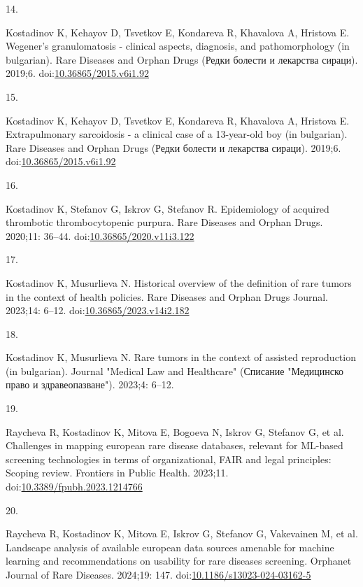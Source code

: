 \documentclass[
  12pt,
  letterpaper,
  DIV=11,
  numbers=noendperiod]{scrartcl}
\newlength{\cslhangindent}
\newlength{\csllabelwidth}
\newenvironment{CSLReferences}[2] %
 {\begin{list}{}{%
  \setlength{\itemindent}{0pt}
  \setlength{\leftmargin}{0pt}
  \setlength{\parsep}{0pt}
  \ifodd #1
   \setlength{\leftmargin}{\cslhangindent}
   \setlength{\itemindent}{-1\cslhangindent}
  \fi
  \setlength{\itemsep}{#2\baselineskip}}}
 {\end{list}}
\newcommand{\CSLLeftMargin}[1]{\parbox[t]{\csllabelwidth}{\strut#1\strut}}
\newcommand{\CSLRightInline}[1]{\parbox[t]{\linewidth - \csllabelwidth}{\strut#1\strut}}
\begin{document}
\begin{CSLReferences}{0}{1}
\CSLLeftMargin{14. }%
\CSLRightInline{Kostadinov K, Kehayov D, Tsvetkov E, Kondareva R,
Khavalova A, Hristova E. Wegener's granulomatosis - clinical aspects,
diagnosis, and pathomorphology (in bulgarian). Rare Diseases and Orphan
Drugs (Редки болести и лекарства сираци). 2019;6.
doi:\href{https://doi.org/10.36865/2015.v6i1.92}{10.36865/2015.v6i1.92}}

\CSLLeftMargin{15. }%
\CSLRightInline{Kostadinov K, Kehayov D, Tsvetkov E, Kondareva R,
Khavalova A, Hristova E. Extrapulmonary sarcoidosis - a clinical case of
a 13-year-old boy (in bulgarian). Rare Diseases and Orphan Drugs (Редки
болести и лекарства сираци). 2019;6.
doi:\href{https://doi.org/10.36865/2015.v6i1.92}{10.36865/2015.v6i1.92}}

\CSLLeftMargin{16. }%
\CSLRightInline{Kostadinov K, Stefanov G, Iskrov G, Stefanov R.
Epidemiology of acquired thrombotic thrombocytopenic purpura. Rare
Diseases and Orphan Drugs. 2020;11: 36--44.
doi:\href{https://doi.org/10.36865/2020.v11i3.122}{10.36865/2020.v11i3.122}}

\CSLLeftMargin{17. }%
\CSLRightInline{Kostadinov K, Musurlieva N. Historical overview of the
definition of rare tumors in the context of health policies. Rare
Diseases and Orphan Drugs Journal. 2023;14: 6--12.
doi:\href{https://doi.org/10.36865/2023.v14i2.182}{10.36865/2023.v14i2.182}}

\CSLLeftMargin{18. }%
\CSLRightInline{Kostadinov K, Musurlieva N. Rare tumors in the context
of assisted reproduction (in bulgarian). Journal "Medical Law and
Healthcare" (Списание "Медицинско право и здравеопазване"). 2023;4:
6--12. }

\CSLLeftMargin{19. }%
\CSLRightInline{Raycheva R, Kostadinov K, Mitova E, Bogoeva N, Iskrov G,
Stefanov G, et al. Challenges in mapping european rare disease
databases, relevant for ML-based screening technologies in terms of
organizational, FAIR and legal principles: Scoping review. Frontiers in
Public Health. 2023;11.
doi:\href{https://doi.org/10.3389/fpubh.2023.1214766}{10.3389/fpubh.2023.1214766}}

\CSLLeftMargin{20. }%
\CSLRightInline{Raycheva R, Kostadinov K, Mitova E, Iskrov G, Stefanov
G, Vakevainen M, et al. Landscape analysis of available european data
sources amenable for machine learning and recommendations on usability
for rare diseases screening. Orphanet Journal of Rare Diseases. 2024;19:
147.
doi:\href{https://doi.org/10.1186/s13023-024-03162-5}{10.1186/s13023-024-03162-5}}


\end{CSLReferences}
\end{document}
